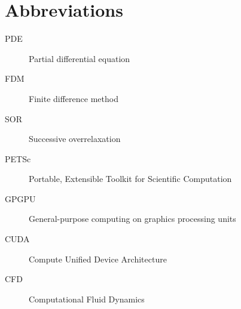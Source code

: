 \chapter{Abbreviations}

\begin{description}
	\item[PDE] Partial differential equation
	\item[FDM] Finite difference method
	\item[SOR] Successive overrelaxation
	\item[PETSc] Portable, Extensible Toolkit for Scientific Computation
	\item[GPGPU] General-purpose computing on graphics processing units
	\item[CUDA] Compute Unified Device Architecture
	\item[CFD] Computational Fluid Dynamics
\end{description}
